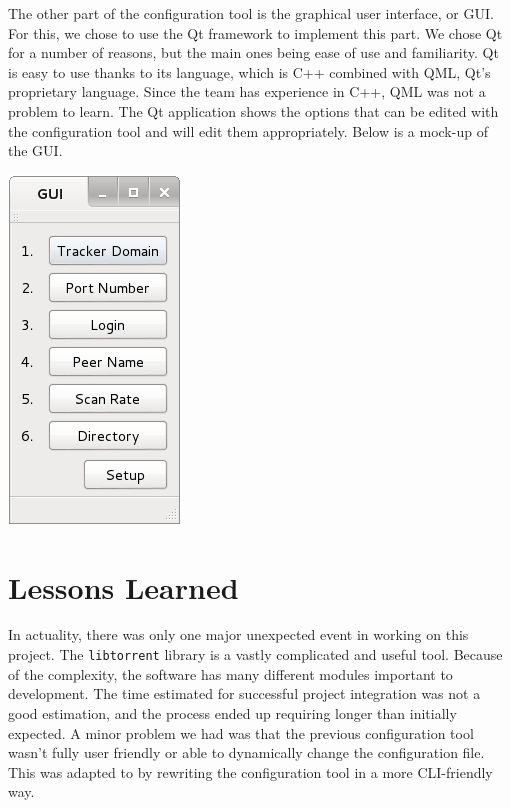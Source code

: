 \documentclass[12 pt]{article}
\begin{document}
	The other part of the configuration tool is the graphical user interface, or GUI. For this, we chose to use the Qt framework to implement this part. We chose Qt for a number of reasons, but the main ones being ease of use and familiarity. Qt is easy to use thanks to its language, which is C++ combined with QML, Qt's proprietary language. Since the team has experience in C++, QML was not a problem to learn. The Qt application shows the options that can be edited with the configuration tool and will edit them appropriately. Below is a mock-up of the GUI.
	
	\begin{center}
\includegraphics[width=0.4\linewidth]{GUI}
\end{center}

	
	\section{Lessons Learned}
	
	In actuality, there was only one major unexpected event in working on this project. The \texttt{libtorrent} library is a vastly complicated and useful tool. Because of the complexity, the software has many different modules important to development. The time estimated for successful project integration was not a good estimation, and the process ended up requiring longer than initially expected. A minor problem we had was that the previous configuration tool wasn't fully user friendly or able to dynamically change the configuration file. This was adapted to by rewriting the configuration tool in a more CLI-friendly way.
	
\end{document}
